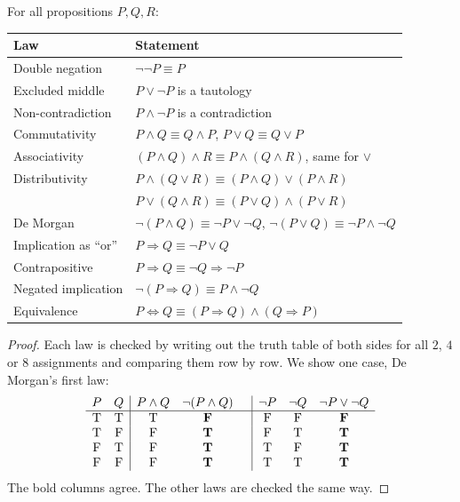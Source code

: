 \begin{theorem}
\label{thm:logic-laws}
For all propositions $P, Q, R$:
\begin{center}
\begin{tabular}{@{}ll@{}}
  \toprule
  Law & Statement \\
  \midrule
  Double negation & $\lnot\lnot P \equiv P$ \\
  Excluded middle & $P \lor \lnot P$ is a tautology \\
  Non-contradiction & $P \land \lnot P$ is a contradiction \\
  Commutativity & $P \land Q \equiv Q \land P$, \quad $P \lor Q \equiv Q \lor P$ \\
  Associativity & $(P \land Q) \land R \equiv P \land (Q \land R)$, \quad same for $\lor$ \\
  Distributivity & $P \land (Q \lor R) \equiv (P \land Q) \lor (P \land R)$ \\
    & $P \lor (Q \land R) \equiv (P \lor Q) \land (P \lor R)$ \\
  De Morgan & $\lnot(P \land Q) \equiv \lnot P \lor \lnot Q$, \quad
    $\lnot(P \lor Q) \equiv \lnot P \land \lnot Q$ \\
  Implication as \enquote{or} & $P \Rightarrow Q \equiv \lnot P \lor Q$ \\
  Contrapositive & $P \Rightarrow Q \equiv \lnot Q \Rightarrow \lnot P$ \\
  Negated implication & $\lnot(P \Rightarrow Q) \equiv P \land \lnot Q$ \\
  Equivalence & $P \Leftrightarrow Q \equiv (P \Rightarrow Q) \land (Q \Rightarrow P)$ \\
  \bottomrule
\end{tabular}
\end{center}
\end{theorem}

\begin{proof}
Each law is checked by writing out the truth table of both sides for all $2$, $4$
or $8$ assignments and comparing them row by row. We show one case, De Morgan's
first law:
\[
\begin{array}{cc|ccc|ccc}
  P & Q & P \land Q & \lnot(P \land Q) & & \lnot P & \lnot Q & \lnot P \lor \lnot Q \\
  \hline
  \mathrm{T} & \mathrm{T} & \mathrm{T} & \mathbf{F} & & \mathrm{F} & \mathrm{F} & \mathbf{F} \\
  \mathrm{T} & \mathrm{F} & \mathrm{F} & \mathbf{T} & & \mathrm{F} & \mathrm{T} & \mathbf{T} \\
  \mathrm{F} & \mathrm{T} & \mathrm{F} & \mathbf{T} & & \mathrm{T} & \mathrm{F} & \mathbf{T} \\
  \mathrm{F} & \mathrm{F} & \mathrm{F} & \mathbf{T} & & \mathrm{T} & \mathrm{T} & \mathbf{T}
\end{array}
\]
The bold columns agree. The other laws are checked the same way.
\end{proof}

